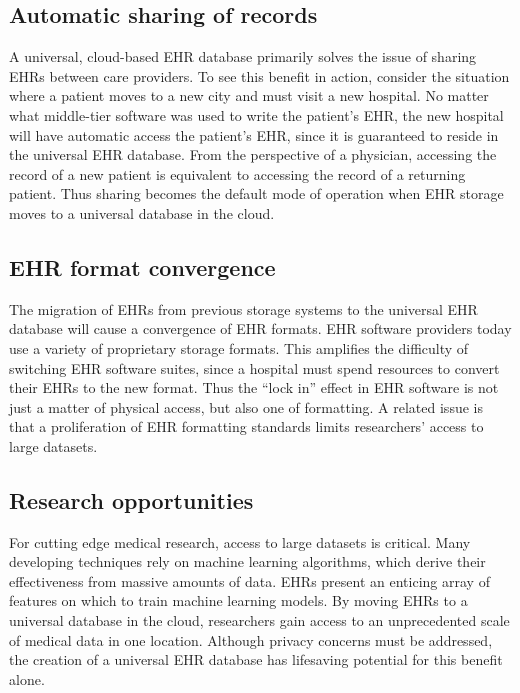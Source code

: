 \subsection{Automatic sharing of records}
A universal, cloud-based EHR database primarily solves the issue of sharing EHRs between care providers. To see this benefit in action, consider the situation where a patient moves to a new city and must visit a new hospital. No matter what middle-tier software was used to write the patient's EHR, the new hospital will have automatic access the patient's EHR, since it is guaranteed to reside in the universal EHR database. From the perspective of a physician, accessing the record of a new patient is equivalent to accessing the record of a returning patient. Thus sharing becomes the default mode of operation when EHR storage moves to a universal database in the cloud.

\subsection{EHR format convergence}
The migration of EHRs from previous storage systems to the universal EHR database will cause a convergence of EHR formats. EHR software providers today use a variety of proprietary storage formats. This amplifies the difficulty of switching EHR software suites, since a hospital must spend resources to convert their EHRs to the new format. Thus the ``lock in'' effect in EHR software is not just a matter of physical access, but also one of formatting. A related issue is that a proliferation of EHR formatting standards limits researchers' access to large datasets.

\subsection{Research opportunities}
For cutting edge medical research, access to large datasets is critical. Many developing techniques rely on machine learning algorithms, which derive their effectiveness from massive amounts of data. EHRs present an enticing array of features on which to train machine learning models. By moving EHRs to a universal database in the cloud, researchers gain access to an unprecedented scale of medical data in one location. Although privacy concerns must be addressed, the creation of a universal EHR database has lifesaving potential for this benefit alone.

